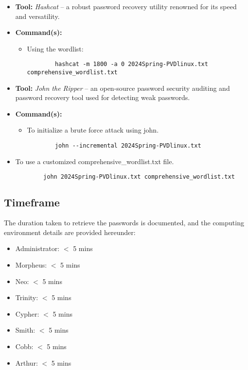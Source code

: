 \documentclass{article}
\begin{document}
\begin{itemize}
    \item \textbf{Tool:} \textit{Hashcat} -- a robust password recovery utility renowned for its speed and versatility.
    \item \textbf{Command(s):} 
    \begin{itemize}
        \item Using the wordlist:
        \begin{verbatim}
        hashcat -m 1800 -a 0 2024Spring-PVDlinux.txt comprehensive_wordlist.txt
        \end{verbatim}
    \end{itemize}
    \item \textbf{Tool:} \textit{John the Ripper} -- an open-source password security auditing and password recovery tool used for detecting weak passwords.
    \item \textbf{Command(s):} 
    \begin{itemize}
        \item To initialize a brute force attack using john.
        \begin{verbatim}
        john --incremental 2024Spring-PVDlinux.txt
        \end{verbatim}
    \end{itemize}
        \item To use a customized comprehensive\_wordlist.txt file. 
        \begin{verbatim}
        john 2024Spring-PVDlinux.txt comprehensive_wordlist.txt
        \end{verbatim}
\end{itemize}

\subsection{Timeframe}
The duration taken to retrieve the passwords is documented, and the computing environment details are provided hereunder:

\begin{itemize}
    \item Administrator: $<$ 5 mins
    \item Morpheus: $<$ 5 mins
    \item Neo: $<$ 5 mins
    \item Trinity: $<$ 5 mins
    \item Cypher: $<$ 5 mins
    \item Smith: $<$ 5 mins
    \item Cobb: $<$ 5 mins
    \item Arthur: $<$ 5 mins
\end{itemize}
\end{document}
